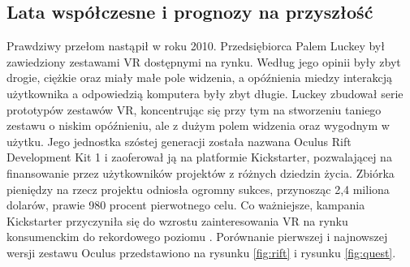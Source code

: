 \subsection{Lata współczesne i prognozy na przyszłość}

Prawdziwy przełom nastąpił w roku 2010. Przedsiębiorca Palem Luckey był zawiedziony zestawami VR dostępnymi na rynku. Według jego opinii były zbyt drogie, ciężkie oraz miały małe pole widzenia, a opóźnienia miedzy interakcją użytkownika a odpowiedzią komputera były zbyt długie. Luckey zbudował serie prototypów zestawów VR, koncentrując się przy tym na stworzeniu taniego zestawu o niskim opóźnieniu, ale z dużym polem widzenia oraz wygodnym w użytku. Jego jednostka szóstej generacji została nazwana Oculus Rift Development Kit 1 i zaoferował ją na platformie Kickstarter, pozwalającej na finansowanie przez użytkowników projektów z różnych dziedzin życia. Zbiórka pieniędzy na rzecz projektu odniosła ogromny sukces, przynosząc 2,4 miliona dolarów, prawie 980 procent pierwotnego celu. Co ważniejsze, kampania Kickstarter przyczyniła się do wzrostu zainteresowania VR na rynku konsumenckim do rekordowego poziomu \citep{virtualfor}. Porównanie pierwszej i najnowszej wersji zestawu Oculus przedstawiono na rysunku \ref{fig:rift} i rysunku \ref{fig:quest}.

